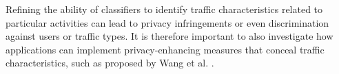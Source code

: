 \documentclass[conference]{IEEEtran}
\begin{document}
Refining the ability of classifiers to identify traffic characteristics related to particular activities can lead to privacy infringements or even discrimination against users or traffic types. It is therefore important to also investigate how applications can implement privacy-enhancing measures that conceal traffic characteristics, such as proposed by Wang et al. \cite{wang2017walkie}.










 


\end{document}
